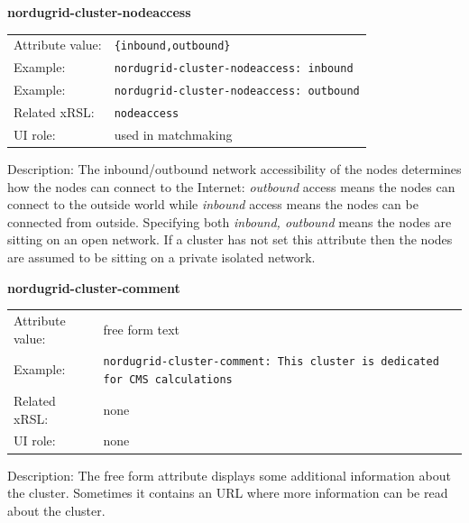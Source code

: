 \documentclass{article}
\begin{document}
  \hspace*{0.5cm}
  \begin{shaded}
    \textbf{nordugrid-cluster-nodeaccess}
  \end{shaded}
  \begin{tabular}{lp{10cm}}  
    Attribute value:& \verb#{inbound,outbound}#\\
    Example:&  \verb#nordugrid-cluster-nodeaccess: inbound#\\
    Example:&  \verb#nordugrid-cluster-nodeaccess: outbound#\\
    Related xRSL:& \verb#nodeaccess#\\
    UI role:& used in matchmaking\\ 
  \end{tabular}

Description: The inbound/outbound network accessibility of the nodes
determines how the nodes can connect to the Internet: {\it outbound}
access means the nodes can connect to the outside world while {\it inbound}
access means the nodes can be connected from outside.
Specifying both {\it inbound, outbound} means the nodes are sitting on an 
open network. If a cluster has not set this attribute then the 
nodes are assumed to be sitting on a private isolated network.



  \hspace*{0.5cm}
  \begin{shaded}
    \textbf{nordugrid-cluster-comment}
  \end{shaded}
  \begin{tabular}{lp{10cm}}  
    Attribute value:& free form text\\
    Example:& \verb#nordugrid-cluster-comment: This cluster is dedicated for CMS calculations#\\
    Related xRSL:& none\\
    UI role:& none\\
  \end{tabular}

Description: The free form attribute displays some additional information about 
the cluster. Sometimes it contains an URL where more information can be read
about the cluster.
\end{document}

